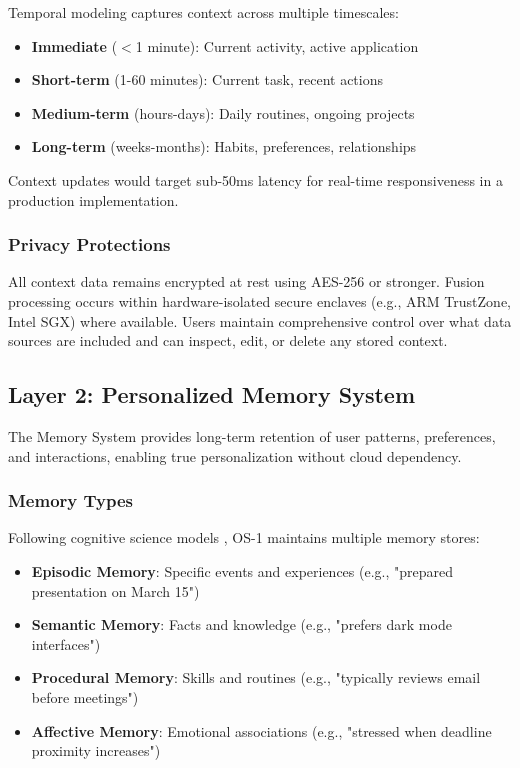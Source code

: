 \documentclass[conference]{IEEEtran}
\begin{document}
Temporal modeling captures context across multiple timescales:
\begin{itemize}
\item \textbf{Immediate} ($<$1 minute): Current activity, active application
\item \textbf{Short-term} (1-60 minutes): Current task, recent actions
\item \textbf{Medium-term} (hours-days): Daily routines, ongoing projects
\item \textbf{Long-term} (weeks-months): Habits, preferences, relationships
\end{itemize}

Context updates would target sub-50ms latency for real-time responsiveness in a production implementation.

\subsubsection{Privacy Protections}

All context data remains encrypted at rest using AES-256 or stronger. Fusion processing occurs within hardware-isolated secure enclaves (e.g., ARM TrustZone, Intel SGX) where available. Users maintain comprehensive control over what data sources are included and can inspect, edit, or delete any stored context.

\subsection{Layer 2: Personalized Memory System}

The Memory System provides long-term retention of user patterns, preferences, and interactions, enabling true personalization without cloud dependency.

\subsubsection{Memory Types}

Following cognitive science models \cite{tulving1972episodic}, OS-1 maintains multiple memory stores:

\begin{itemize}
\item \textbf{Episodic Memory}: Specific events and experiences (e.g., "prepared presentation on March 15")
\item \textbf{Semantic Memory}: Facts and knowledge (e.g., "prefers dark mode interfaces")
\item \textbf{Procedural Memory}: Skills and routines (e.g., "typically reviews email before meetings")
\item \textbf{Affective Memory}: Emotional associations (e.g., "stressed when deadline proximity increases")
\end{itemize}
\end{document}
